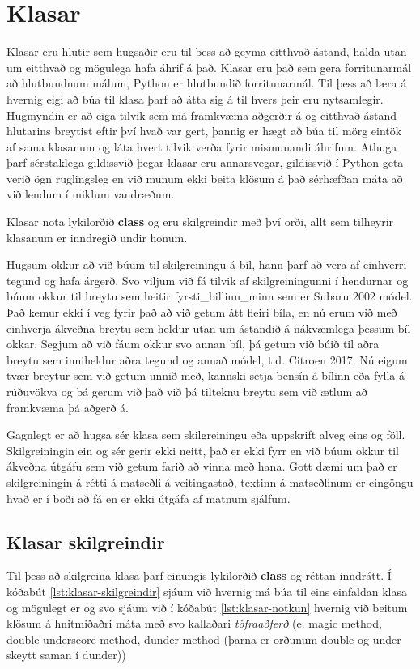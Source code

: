 
\chapter{Klasar}\label{k:klasar}
Klasar eru hlutir sem hugsaðir eru til þess að geyma eitthvað ástand, halda utan um eitthvað og mögulega hafa áhrif á það.
Klasar eru það sem gera forritunarmál að hlutbundnum málum, Python er hlutbundið forritunarmál.
Til þess að læra á hvernig eigi að búa til klasa þarf að átta sig á til hvers þeir eru nytsamlegir.
Hugmyndin er að eiga tilvik sem má framkvæma aðgerðir á og eitthvað ástand hlutarins breytist eftir því hvað var gert, þannig er hægt að búa til mörg eintök af sama klasanum og láta hvert tilvik verða fyrir mismunandi áhrifum.
Athuga þarf sérstaklega gildissvið þegar klasar eru annarsvegar, gildissvið í Python geta verið ögn ruglingsleg en við munum ekki beita klösum á það sérhæfðan máta að við lendum í miklum vandræðum.

Klasar nota lykilorðið \textbf{class} og eru skilgreindir með því orði, allt sem tilheyrir klasanum er inndregið undir honum.

Hugsum okkur að við búum til skilgreiningu á bíl, hann þarf að vera af einhverri tegund og hafa árgerð.
Svo viljum við fá tilvik af skilgreiningunni í hendurnar og búum okkur til breytu sem heitir fyrsti\_billinn\_minn sem er Subaru 2002 módel.
Það kemur ekki í veg fyrir það að við getum átt fleiri bíla, en nú erum við með einhverja ákveðna breytu sem heldur utan um ástandið á nákvæmlega þessum bíl okkar.
Segjum að við fáum okkur svo annan bíl, þá getum við búið til aðra breytu sem inniheldur aðra tegund og annað módel, t.d. Citroen 2017.
Nú eigum tvær breytur sem við getum unnið með, kannski setja bensín á bílinn eða fylla á rúðuvökva og þá gerum við það við þá tilteknu breytu sem við ætlum að framkvæma þá aðgerð á.

Gagnlegt er að hugsa sér klasa sem skilgreiningu eða uppskrift alveg eins og föll.
Skilgreiningin ein og sér gerir ekki neitt, það er ekki fyrr en við búum okkur til ákveðna útgáfu sem við getum farið að vinna með hana.
Gott dæmi um það er skilgreiningin á rétti á matseðli á veitingastað, textinn á matseðlinum er eingöngu hvað er í boði að fá en er ekki útgáfa af matnum sjálfum.

\section{Klasar skilgreindir}\label{uk:klasar-skilgreindir}
Til þess að skilgreina klasa þarf einungis lykilorðið \textbf{class} og réttan inndrátt.
Í kóðabút \ref{lst:klasar-skilgreindir} sjáum við hvernig má búa til eins einfaldan klasa og mögulegt er og svo sjáum við í kóðabút \ref{lst:klasar-notkun} hvernig við beitum klösum á hnitmiðaðri máta með svo kallaðari \textit{töfraaðferð} (e. magic method, double underscore method, dunder method (þarna er orðunum double og under skeytt saman í dunder))

